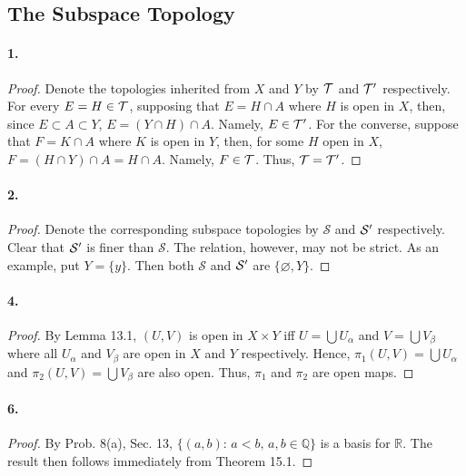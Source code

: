 \setcounter{subsection}{15}
\subsection{The Subspace Topology}
  \paragraph{1.}
  \begin{proof}
    Denote the topologies inherited from $X$ and $Y$ by $\mathcal{T}$ and $\mathcal{T}^\prime$ 
    respectively. For every $E=H\in\mathcal{T}$, supposing that $E=H\cap A$ where $H$
    is open in $X$, then, since $E \subset A\subset Y$, $E=(Y\cap H)\cap A$. 
    Namely, $E\in\mathcal{T}^\prime$. For the converse, suppose that $F=K\cap A$ where $K$
    is open in $Y$, then, for some $H$ open in $X$, $F=(H\cap Y)\cap A=H\cap 
    A$. Namely, $F\in\mathcal{T}$. Thus, $\mathcal{T}=\mathcal{T}^\prime$.
  \end{proof}
  
  \paragraph{2.}
  \begin{proof}
    Denote the corresponding subspace topologies by $\mathcal{S}$ and 
    $\mathcal{S}^\prime$ respectively. Clear that $\mathcal{S}^\prime$ is finer than 
    $\mathcal{S}$. The relation, however, may not be strict. As an example, put
    $Y=\{y\}$. Then both $\mathcal{S}$ and $\mathcal{S}^\prime$ are $\{\varnothing,
    Y\}$.
  \end{proof}
  
  \paragraph{4.}
  \begin{proof}
    By Lemma 13.1, $(U, V)$ is open in $X\times Y$ iff $U=\bigcup U_\alpha$ and 
    $V=\bigcup V_\beta$ where all $U_\alpha$ and $V_\beta$ are open in $X$ and 
    $Y$ respectively. Hence, $\pi_1(U,V)=\bigcup U_\alpha$ and $\pi_2(U,V)=
    \bigcup V_\beta$ are also open. Thus, $\pi_1$ and $\pi_2$ are open maps.
  \end{proof}
  
  \paragraph{6.}
  \begin{proof}
    By Prob. 8(a), Sec. 13, $\{(a,b):\,a<b,\,a,b\in\mathbb{Q}\}$ is a basis for
    $\mathbb{R}$. The result then follows immediately from Theorem 15.1.
  \end{proof}
  
